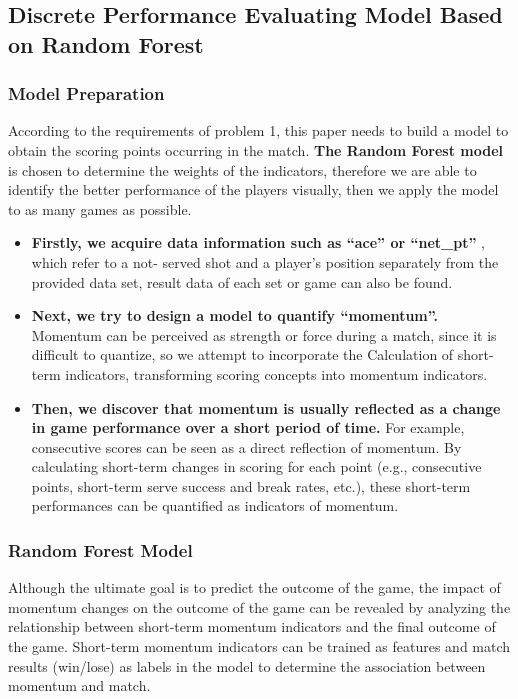 \documentclass{mcmthesis}
\begin{document}
\subsection{Discrete Performance Evaluating Model Based on Random Forest} %

\subsubsection{Model Preparation} %

According to the requirements of problem 1, this paper needs to build a model to obtain the
scoring points occurring in the match. {\bf The Random Forest model} is chosen to determine the
weights of the indicators, therefore we are able to identify the better performance of the players
visually, then we apply the model to as many games as possible.

\begin{itemize}
    \item {\bf Firstly, we acquire data information such as “ace” or “net\_pt” }, which refer to a not- served shot and a player’s position separately from the provided data set, result data of each set
    or game can also be found.
    \item {\bf Next, we try to design a model to quantify “momentum”.} Momentum can be perceived as
    strength or force during a match, since it is difficult to quantize, so we attempt to incorporate the
    Calculation of short-term indicators, transforming scoring concepts into momentum indicators. 
    \item {\bf Then, we discover that momentum is usually reflected as a change in game
    performance over a short period of time. }For example, consecutive scores can be seen as a
    direct reflection of momentum. By calculating short-term changes in scoring for each point
    (e.g., consecutive points, short-term serve success and break rates, etc.), these short-term
    performances can be quantified as indicators of momentum.
\end{itemize}

\subsubsection{Random Forest Model}  %
Although the ultimate goal is to predict the outcome of the game, the impact of momentum
changes on the outcome of the game can be revealed by analyzing the relationship between short-term momentum indicators and the final outcome of the game. Short-term momentum indicators
can be trained as features and match results (win/lose) as labels in the model to determine the
association between momentum and match. 
\end{document}
